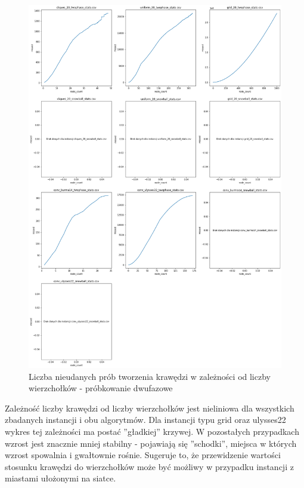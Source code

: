 \begin{figure}[h!]
    \centering
    \includegraphics[width=\textwidth]{chapters/experiments/img/merged_plots/per1_all/missed.png}
    \caption{Liczba nieudanych prób tworzenia krawędzi w zależności od liczby wierzchołków - próbkowanie dwufazowe}
    \label{fig:small_missed}
\end{figure}

Zależność liczby krawędzi od liczby wierzchołków jest nieliniowa dla wszystkich zbadanych instancji i obu algorytmów.
Dla instancji typu grid oraz ulysses22 wykres tej zależności ma postać ''gładkiej'' krzywej.
W pozostałych przypadkach wzrost jest znacznie mniej stabilny - pojawiają się ''schodki'', miejsca w których wzrost
spowalnia i gwałtownie rośnie.
Sugeruje to, że przewidzenie wartości stosunku krawędzi do wierzchołków może być możliwy w przypadku
instancji z miastami ułożonymi na siatce.

